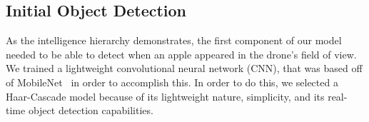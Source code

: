\subsection{Initial Object Detection}
As the intelligence hierarchy demonstrates, the first component of our model needed to be able to detect when an apple appeared in the drone's field of view. 
We trained a lightweight convolutional neural network (CNN), that was based off of MobileNet~\cite{Sandler2018, } in order to accomplish this. 
In order to do this, we selected a Haar-Cascade model because of its lightweight nature, simplicity, and its real-time object detection capabilities. 
